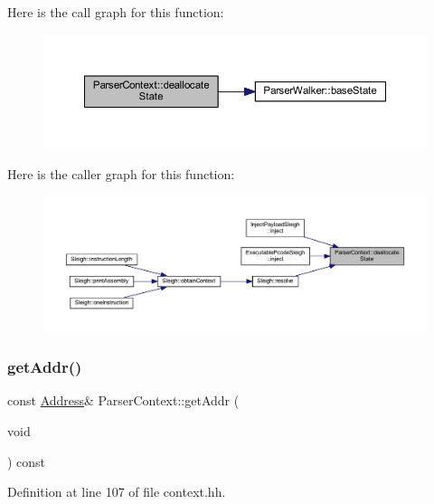 Here is the call graph for this function\+:
\nopagebreak
\begin{figure}[H]
\begin{center}
\leavevmode
\includegraphics[width=350pt]{class_parser_context_aeadc3c9beab067825f0f0c0a25618f84_cgraph}
\end{center}
\end{figure}
Here is the caller graph for this function\+:
\nopagebreak
\begin{figure}[H]
\begin{center}
\leavevmode
\includegraphics[width=350pt]{class_parser_context_aeadc3c9beab067825f0f0c0a25618f84_icgraph}
\end{center}
\end{figure}
\mbox{\label{class_parser_context_a6e19b91b26906e6678f1065d9118da05}} 
\subsubsection{\texorpdfstring{getAddr()}{getAddr()}}
{\footnotesize\ttfamily const \mbox{\hyperlink{class_address}{Address}}\& Parser\+Context\+::get\+Addr (\begin{DoxyParamCaption}\item[{void}]{ }\end{DoxyParamCaption}) const\hspace{0.3cm}{\ttfamily [inline]}}



Definition at line 107 of file context.\+hh.

